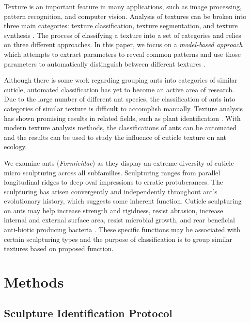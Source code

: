 \documentclass{aci}
\begin{document}
Texture is an important feature in many applications, such as image processing,
pattern recognition, and computer vision. Analysis of textures can be broken
into three main categories: texture classification, texture segmentation, and
texture synthesis \cite{reed_review_1993}. The process of classifying a texture
into a set of categories and relies on three different approaches. In this
paper, we focus on a \textit{model-based approach} which attempts to extract
parameters to reveal common patterns and use those parameters to automatically
distinguish between different textures \cite{maillard_texture_2003}.

Although there is some work regarding grouping ants into categories of similar
cuticle, automated classification has yet to become an active area of research.
Due to the large number of different ant species, the classification of ants
into categories of similar texture is difficult to accomplish manually. Texture
analysis has shown promising results in related fields, such as plant
identification \cite{boudra_plant_2018}. With modern texture analysis methods,
the classifications of ants can be automated and the results can be used to
study the influence of cuticle texture on ant ecology.

We examine ants (\textit{Formicidae}) as they display an extreme diversity of
cuticle micro sculpturing across all subfamilies. Sculpturing ranges from
parallel longitudinal ridges to deep oval impressions to erratic protuberances.
The sculpturing has arisen convergently and independently throughout ant’s
evolutionary history, which suggests some inherent function. Cuticle sculpturing
on ants may help increase strength and rigidness, resist abrasion, increase
internal and external surface area, resist microbial growth, and rear beneficial
anti-biotic producing bacteria \cite{johnson_effect_2011,
  bruckner_relationship_2017, currie_coevolved_2006}. These specific functions may
be associated with certain sculpturing types and the purpose of classification
is to group similar textures based on proposed function.

\section{Methods}

\subsection{Sculpture Identification Protocol}
\end{document}
